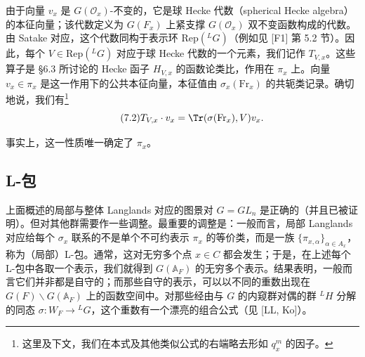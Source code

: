 由于向量 $v_x$ 是 $G(\mathcal{O}_x)$-不变的，它是球 Hecke 代数（spherical Hecke algebra）的本征向量；该代数定义为 $G(F_x)$ 上紧支撑 $G(\mathcal{O}_x)$ 双不变函数构成的代数。由 Satake 对应，这个代数同构于表示环 $\mathrm{Rep}({}^{L}G)$（例如见 [F1] 第 5.2 节）。因此，每个 $V\in\mathrm{Rep}({}^{L}G)$ 对应于球 Hecke 代数的一个元素，我们记作 $T_{V,x}$。这些算子是 §6.3 所讨论的 Hecke 函子 $H_{V,x}$ 的函数论类比，作用在 $\pi_x$ 上。向量 $v_x\in\pi_x$ 是这一作用下的公共本征向量，本征值由 $\sigma_x(\mathrm{Fr}_x)$ 的共轭类记录。确切地说，我们有\footnote{这里及下文，我们在本式及其他类似公式的右端略去形如 $q_x^m$ 的因子。}
\begin{equation}\tag{7.2}
T_{V,x}\cdot v_x = \Tr(\sigma(\mathrm{Fr}_x),V)v_x.
\end{equation}

事实上，这一性质唯一确定了 $\pi_x$。

\subsection{L-包}

上面概述的局部与整体 Langlands 对应的图景对 $G=GL_n$ 是正确的（并且已被证明）。但对其他群需要作一些调整。最重要的调整是：一般而言，局部 Langlands 对应给每个 $\sigma_x$ 联系的不是单个不可约表示 $\pi_x$ 的等价类，而是一族 $\{\pi_{x,\alpha}\}_{\alpha\in A_x}$，称为（局部）L-包。通常，这对无穷多个点 $x\in C$ 都会发生；于是，在上述每个 L-包中各取一个表示，我们就得到 $G(\mathbb{A}_F)$ 的无穷多个表示。结果表明，一般而言它们并非都是自守的；而那些自守的表示，可以以不同的重数出现在 $G(F)\backslash G(\mathbb{A}_F)$ 上的函数空间中。对那些经由与 $G$ 的内窥群对偶的群 ${}^{L}H$ 分解的同态 $\sigma: W_F\to{}^{L}G$，这个重数有一个漂亮的组合公式（见 [LL, Ko]）。

